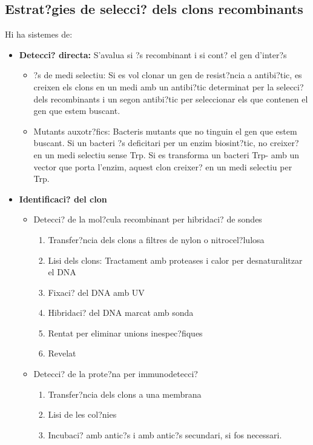 \subsection{Estrat?gies de selecci? dels clons recombinants}
\label{sec:estr-de-selecc}
Hi ha sistemes de:
\begin{itemize}
\item \textbf{Detecci? directa:} S'avalua si ?s recombinant i si cont? el gen d'inter?s
  \begin{itemize}
  \item ?s de medi selectiu: Si es vol clonar un gen de resist?ncia a antibi?tic, es creixen els clons en un medi amb un antibi?tic determinat per la selecci? dels recombinants i un segon antibi?tic per seleccionar els que contenen el gen que estem buscant.
  
  \item Mutants auxotr?fics: Bacteris mutants que no tinguin el gen que estem buscant. Si un bacteri ?s deficitari per un enzim biosint?tic, no creixer? en un medi selectiu sense Trp. Si es transforma un bacteri Trp- amb un vector que porta l'enzim, aquest clon creixer? en un medi selectiu per Trp.
  \end{itemize}
\item \textbf{Identificaci? del clon}
  \begin{itemize}
  \item Detecci? de la mol?cula recombinant per hibridaci? de sondes
    \begin{enumerate}
    \item Transfer?ncia dels clons a filtres de nylon o nitrocel?lulosa
    \item Lisi dels clons: Tractament amb proteases i calor per desnaturalitzar el DNA
    \item Fixaci? del DNA amb UV
    \item Hibridaci? del DNA marcat amb sonda
    \item Rentat per eliminar unions inespec?fiques
    \item Revelat
    \end{enumerate}
  \item Detecci? de la prote?na per immunodetecci?
    \begin{enumerate}
    \item Transfer?ncia dels clons a una membrana
    \item Lisi de les col?nies
    \item Incubaci? amb antic?s i amb antic?s secundari, si fos necessari.
    \end{enumerate}
  \end{itemize}
\end{itemize}